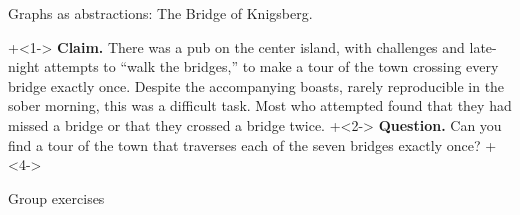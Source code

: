 \documentclass[10pt]{beamer}
\begin{document}
\begin{frame}{Graphs as abstractions: The Bridge of Knigsberg.}
\begin{minipage}{.47\textwidth}
\end{minipage} %

\vfill 
\onslide+<1-> \colorbox{green!30}{\textbf{Claim.}}  There was a pub on the center
island, with challenges and late-night attempts to “walk the bridges,” to make a tour of the town crossing every bridge exactly once. Despite the accompanying boasts, rarely reproducible in the sober morning, this was a difficult task.  Most who attempted found that they had missed a bridge or that they crossed a bridge twice.
\vfill 
\onslide+<2-> \colorbox{red!30}{\textbf{Question.}} Can you find a tour of the town that traverses each of the seven bridges exactly once? \hfill \onslide+<4-> \href{https://www.youtube.com/watch?v=C7YrMRdLkqo}{\underline{}}
\end{frame}

\begin{frame}[standout]
Group exercises
\end{frame}
\end{document}
